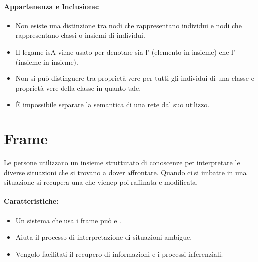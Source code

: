 \paragraph{Appartenenza e Inclusione:}

\begin{itemize}
  \item Non esiste una distinzione tra nodi che rappresentano individui e nodi che rappresentano classi o insiemi di individui. 
  \item Il legame isA viene usato per denotare sia l' (elemento in insieme) che l' (insieme in insieme).
  \item Non si può distinguere tra proprietà vere per tutti gli individui di una classe e proprietà vere della classe in quanto tale. 
  \item È impossibile separare la semantica di una rete dal suo utilizzo.
\end{itemize}

\section{Frame}

Le persone utilizzano un insieme strutturato di conoscenze per interpretare le diverse situazioni che si trovano a dover affrontare. Quando ci si imbatte in una situazione si recupera una  che vienep poi raffinata e modificata.


\paragraph{Caratteristiche:}

\begin{itemize}
  \item Un sistema che usa i frame può  e . 
  \item Aiuta il processo di interpretazione di situazioni ambigue.  
  \item Vengolo facilitati il recupero di informazioni e i processi inferenziali.
\end{itemize}

